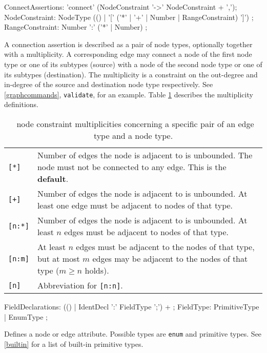\begin{rail}  
  ConnectAssertions: 'connect' (NodeConstraint '->' NodeConstraint + ',');
  NodeConstraint: NodeType (() | '[' ('*' | '+' | Number | RangeConstraint) ']') ;
  RangeConstraint: Number ':' ('*' | Number) ;
\end{rail}
A connection assertion is described as a pair of node types, optionally together with a multiplicity. A corresponding edge may connect a node of the first node type or one of its subtypes (source) with a node of the second node type or one of its subtypes (destination). The multiplicity is a constraint on the out-degree and in-degree of the source and destination node type respectively. See \ref{graphcommands}, \texttt{validate}, for an example. Table \ref{multiplicities} describes the multiplicity definitions.
\begin{table}[htbp]
\begin{tabularx}{\linewidth}{|l|X|}\hline
	\texttt{[*]} & Number of edges the node is adjacent to is unbounded. The node must not be connected to any edge. This is the \textbf{default}.\\
	\texttt{[+]} & Number of edges the node is adjacent to is unbounded. At least one edge must be adjacent to nodes of that type.\\
	\texttt{[n:*]} & Number of edges the node is adjacent to is unbounded. At least $n$ edges must be adjacent to nodes of that type.\\ 
	\texttt{[n:m]} & At least $n$ edges must be adjacent to the nodes of that type, but at most $m$ edges may be adjacent to the nodes of that type ($m \geq n$ holds).\\
	\texttt{[n]} & Abbreviation for \texttt{[n:n]}. \\ \hline
\end{tabularx}
\caption{\GrG\ node constraint multiplicities concerning a specific pair of an edge type and a node type.}
\label{multiplicities}
\end{table}

\begin{rail}    
  FieldDeclarations: (() | IdentDecl ':' FieldType ';') + ;
  FieldType: PrimitiveType | EnumType ; 
\end{rail}
Defines a node or edge attribute. Possible types are \texttt{enum} and primitive types. See \ref{builtin} for a list of built-in primitive types.
